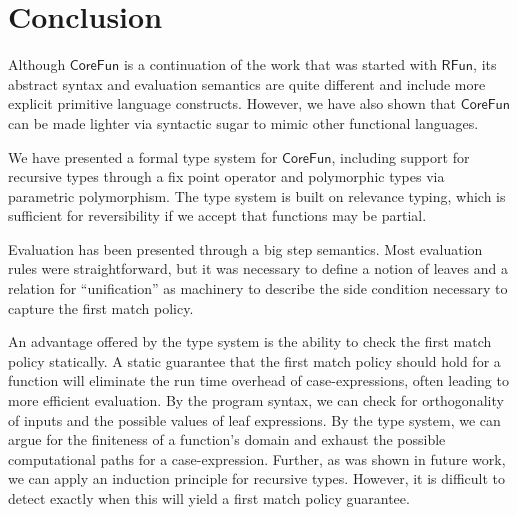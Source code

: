 \documentclass[a4paper,10p,openright]{memoir}
\def\rfunc{\ensuremath{\mathsf{CoreFun}}\xspace}
\def\rfun{\ensuremath{\mathsf{RFun}}\xspace}
\begin{document}









\chapter{Conclusion}\label{sec:conclusion}

Although \rfunc is a continuation of the work that was started with \rfun, its
abstract syntax and evaluation semantics are quite different and include more
explicit primitive language constructs. However, we have also shown that
\rfunc can be made lighter via syntactic sugar to mimic other functional
languages.

We have presented a formal type system for \rfunc, including support for
recursive types through a fix point operator and polymorphic types via
parametric polymorphism. The type system is built on relevance typing, which is
sufficient for reversibility if we accept that functions may be partial.

Evaluation has been presented through a big step semantics. Most evaluation
rules were straightforward, but it was necessary to define a notion of leaves
and a relation for ``unification'' as machinery to describe the side condition
necessary to capture the first match policy.

An advantage offered by the type system is the ability to check the first match
policy statically. A static guarantee that the first match policy should hold
for a function will eliminate the run time overhead of case-expressions, often
leading to more efficient evaluation. By the program syntax, we can check for
orthogonality of inputs and the possible values of leaf expressions. By the
type system, we can argue for the finiteness of a function's domain and exhaust
the possible computational paths for a case-expression. Further, as was shown
in future work, we can apply an induction principle for recursive types.
However, it is difficult to detect exactly when this will yield a first match
policy guarantee.
\end{document}
